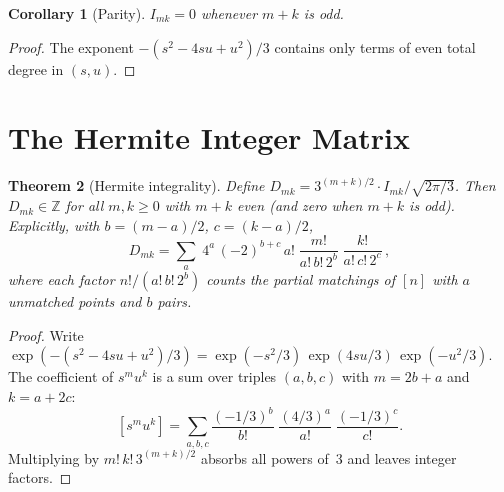 \documentclass[11pt,a4paper]{article}
\theoremstyle{plain}
\newtheorem{theorem}{Theorem}[section]
\newtheorem{corollary}[theorem]{Corollary}
\theoremstyle{definition}
\newcommand{\Z}{\mathbb{Z}}
\begin{document}
\begin{tcolorbox}[colback=black!5, colframe=black!5, boxrule=0pt,
  sharp corners]
\begin{corollary}[Parity]\label{cor:parity}
$I_{mk} = 0$ whenever $m + k$ is odd.
\end{corollary}
\end{tcolorbox}

\begin{proof}
The exponent $-(s^2 - 4su + u^2)/3$ contains only terms of even
total degree in $(s,u)$.
\end{proof}

\section{The Hermite Integer Matrix}

\begin{tcolorbox}[colback=black!5, colframe=black!5, boxrule=0pt,
  sharp corners]
\begin{theorem}[Hermite integrality]\label{thm:hermite-int}
Define
$D_{mk} = 3^{(m+k)/2} \cdot I_{mk} / \sqrt{2\pi/3}$.
Then $D_{mk} \in \Z$ for all $m, k \ge 0$ with $m + k$ even
(and zero when $m + k$ is odd). Explicitly, with
$b = (m-a)/2$, $c = (k-a)/2$,
\[
  D_{mk} = \sum_{a}\; 4^a\, (-2)^{b+c}\, a!\;
  \frac{m!}{a!\, b!\, 2^b}\; \frac{k!}{a!\, c!\, 2^c}\,,
\]
where each factor $n!/(a!\, b!\, 2^b)$ counts the partial matchings
of $[n]$ with $a$ unmatched points and $b$ pairs.
\end{theorem}
\end{tcolorbox}

\begin{proof}
Write
$\exp(-(s^2 - 4su + u^2)/3) = \exp(-s^2/3)\, \exp(4su/3)\,
\exp(-u^2/3)$.
The coefficient of $s^m u^k$ is a sum over triples $(a, b, c)$ with
$m = 2b + a$ and $k = a + 2c$:
\[
  [s^m u^k] = \sum_{a,b,c}
  \frac{(-1/3)^b}{b!}\;\frac{(4/3)^a}{a!}\;\frac{(-1/3)^c}{c!}.
\]
Multiplying by $m!\, k!\, 3^{(m+k)/2}$ absorbs all powers of~$3$
and leaves integer factors.
\end{proof}
\end{document}
